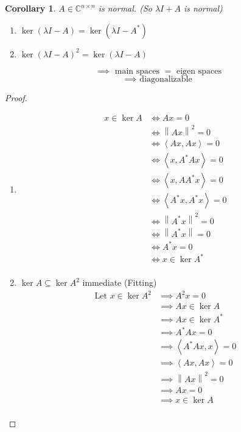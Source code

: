\documentclass{article}
\newtheorem*{corollary}{Corollary}%
\newcommand{\angel}[1]{\left\langle#1\right\rangle}
\newcommand{\norm}[1]{\left\|#1\right\|}
\begin{document}
\begin{corollary} %
  \label{cor125}
  $A \in \mathbb C^{n \times n}$ is normal. (So $\lambda I + A$ is normal)
  \begin{enumerate}
    \item $\ker(\lambda I - A) = \ker(\overline{\lambda} I - A^*)$
    \item $\ker(\lambda I - A)^2 = \ker(\lambda I - A)$
  \end{enumerate}
  \[ \implies \text{ main spaces } = \text{ eigen spaces} \]
  \[ \implies \text{ diagonalizable} \]
\end{corollary}

\begin{proof}
  \begin{enumerate}
    \item
      \begin{align*}
        x \in \ker{A} &\iff Ax = 0 \\
          &\iff \norm{Ax}^2 = 0 \\
          &\iff \angel{Ax, Ax} = 0 \\
          &\iff \angel{x, A^* Ax} = 0 \\
          &\iff \angel{x, AA^* x} = 0 \\
          &\iff \angel{A^* x, A^* x} = 0 \\
          &\iff \norm{A^* x}^2 = 0 \\
          &\iff \norm{A^* x} = 0 \\
          &\iff A^* x = 0 \\
          &\iff x \in \ker{A^*} \\
      \end{align*}
    \item $\ker{A} \subseteq \ker{A^2}$ immediate (Fitting)
      \begin{align*}
        \text{Let } x \in \ker{A^2}
          &\implies A^2 x = 0 \\
          &\implies Ax \in \ker{A} \\
          &\implies Ax \in \ker{A^*} \\
          &\implies A^* Ax = 0 \\
          &\implies \angel{A^* Ax, x} = 0 \\
          &\implies \angel{Ax, Ax} = 0 \\
          &\implies \norm{Ax}^2 = 0 \\
          &\implies Ax = 0 \\
          &\implies x \in \ker{A} \\
      \end{align*}
  \end{enumerate}
\end{proof}
\end{document}
